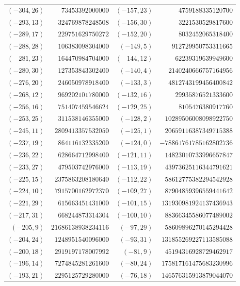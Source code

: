 {\scriptsize\begin{tabular}{@{}r@{\ \ }r@{\qquad}r@{\ \ }r@{}}
$(-304,26)$ & $73453392000000$ & $(-157,23)$ & $4759188335120700$ \\
$(-293,13)$ & $324769878248508$ & $(-156,30)$ & $3221530529817600$ \\
$(-289,17)$ & $229751629750272$ & $(-152,20)$ & $8032452065318400$ \\
$(-288,28)$ & $106383098304000$ & $(-149,5)$ & $912729950753311665$ \\
$(-281,23)$ & $164470984704000$ & $(-144,12)$ & $62239319639949600$ \\
$(-280,30)$ & $127353843302400$ & $(-140,4)$ & $2140240666757164956$ \\
$(-276,20)$ & $246050978918400$ & $(-133,3)$ & $4812743199456400842$ \\
$(-268,12)$ & $969202101780000$ & $(-132,16)$ & $29935876521333600$ \\
$(-256,16)$ & $751407459546624$ & $(-129,25)$ & $8105476380917760$ \\
$(-253,25)$ & $311538146355000$ & $(-128,2)$ & $10289506008098922750$ \\
$(-245,11)$ & $2809413357532050$ & $(-125,1)$ & $20659116387349715388$ \\
$(-237,19)$ & $864116132335200$ & $(-124,0)$ & $-78861761785162802736$ \\
$(-236,22)$ & $628664712998400$ & $(-121,11)$ & $14823010733996657847$ \\
$(-233,27)$ & $479503742976000$ & $(-113,19)$ & $43973625116344791621$ \\
$(-225,15)$ & $2375863208180640$ & $(-112,22)$ & $58612775382294542928$ \\
$(-224,10)$ & $7915700162972370$ & $(-109,27)$ & $87904859396559441642$ \\
$(-221,29)$ & $615663451431000$ & $(-101,15)$ & $131930981924137436943$ \\
$(-217,31)$ & $668244873314304$ & $(-100,10)$ & $88366345586077489002$ \\
$(-205,9)$ & $21686138938234116$ & $(-97,29)$ & $58609896270145294428$ \\
$(-204,24)$ & $1248951540096000$ & $(-93,31)$ & $131855269227113585088$ \\
$(-200,18)$ & $2919197178007992$ & $(-81,9)$ & $45194316928729462917$ \\
$(-196,14)$ & $7274845281261600$ & $(-80,24)$ & $175817161475683230996$ \\
$(-193,21)$ & $2295125729280000$ & $(-76,18)$ & $146576315913879044070$ \\

\end{tabular}}
